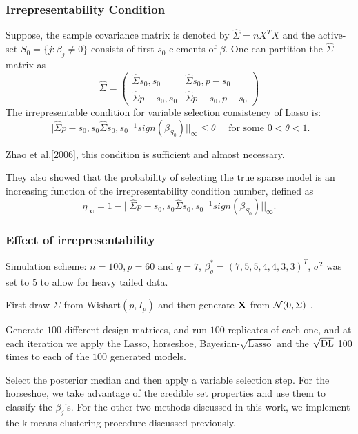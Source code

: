 \documentclass[10pt]{beamer}
\theoremstyle{plain}
\begin{document}
\begin{frame}
	\frametitle{Irrepresentability Condition}
	Suppose, the sample covariance matrix is denoted by $\hat{\Sigma} = nX^T X$ and the active-set $S_0 = \{ j : \beta_j \neq 0\}$ consists of first $s_0$ elements of $\beta$. One can partition the $\hat{\Sigma}$ matrix as
$$ \hat{\Sigma} = \left(\begin{array}{cc}
\hat{\Sigma}{s_0,s_0} & \hat{\Sigma}{s_0,p-s_0} \\ \hat{\Sigma}{p-s_0,s_0} & \hat{\Sigma}{p-s_0,p-s_0} \end{array} \right) $$
 The irrepresentable condition for variable selection consistency of Lasso is:
$$ || \hat{\Sigma}{p-s_0,s_0} \hat{\Sigma}{s_0,s_0}^{-1} sign(\beta_{S_0}) ||_{\infty} \leq \theta \quad \mbox{ for some } 0 < \theta < 1 .$$

Zhao et al.[2006], this condition is sufficient and almost necessary.

They also showed that the probability of selecting the true sparse model is an increasing function of the irrepresentability condition number, defined as $$ \eta_{\infty} = 1 - || \hat{\Sigma}{p-s_0,s_0} \hat{\Sigma}{s_0,s_0}^{-1} sign(\beta_{S_0}) ||_{\infty} . $$
\end{frame}

\begin{frame}
	\frametitle{Effect of irrepresentability}
	\bit 
	\item Simulation scheme: $n = 100, p = 60$ and $q = 7$, $\beta_{q}^* = (7,5,5,4,4,3,3)^T$, $\sigma^2$ was set to $5$ to allow for heavy tailed data. 
	\item First draw $\Sigma$ from $\text{Wishart}(p, I_p)$ and then generate ${\bf X}$ from $\mathcal{N}(0,\Sigma)$ \citep{zhao2006model}.
	\item Generate $100$ different design matrices, and run $100$ replicates of each one, and at each iteration we apply the Lasso, horseshoe, Bayesian-$\sqrt{\text{Lasso}}$ and the $\sqrt{\text{\rm{DL}}}$ 100 times to each of the $100$ generated models. 
	\item Select the posterior median and then apply a variable selection step. \textcolor[rgb]{0.5,0,0.5}{For the horseshoe, we take advantage of the credible set properties and use them to classify the $\beta_j$'s. For the other two methods discussed in this work, we implement the k-means clustering procedure discussed previously.}
	\eit
\end{frame}
\end{document}
